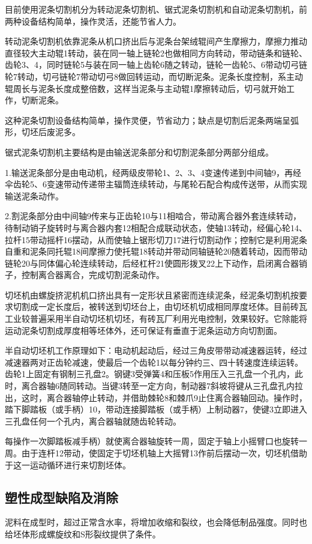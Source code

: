 \documentclass{ctexbook}
\begin{document}
目前使用泥条切割机分为转动泥条切割机、锯式泥条切割机和自动泥条切割机，前两种设备结构简单，操作灵活，还能节省人力。

转动泥条切割机依靠泥条从机口挤出后与泥条台架绒辊间产生摩擦力，摩擦力推动直径较大主动辊1转动，装在同一轴上链轮2也做相同方向转动，带动链条和链轮、齿轮3、4，同时链轮5与装在同一轴上齿轮6随之转动，链轮一齿轮5、6带动切弓链轮7转动，切弓链轮7带动切弓8做回转运动，而切断泥条。泥条长度控制，系主动辊周长与泥条长度成整倍数，这样当泥条与主动辊1摩擦转动后，切弓就开始工作，切断泥条。

这种泥条切割设备结构简单，操作灵便，节省动力；缺点是切割后泥条两端呈弧形，切坯后废泥多。

锯式泥条切割机主要结构是由输送泥条部分和切割泥条部分两部分组成。

1.输送泥条部分是由电动机，经两级皮带轮1、2、3、4变速传递到中间轴9，再经伞齿轮5、6变速带动传递带主辐筒连续转动，与尾轮石配合构成传送带，从而实现输送泥条动作。

2.割泥条部分由中间轴9传来与正齿轮10与11相啮合，带动离合器外套连续转动，待制动销子旋转时与离合器内套12相配合成联动状态，使轴13转动，经偏心轮14、拉杆15带动摇杆16摆动，从而使轴上锯形切刀17进行切割动作；控制它是利用泥条自重和泥条同托辊18间摩擦力使托辊18转动并带动同轴链轮20随着转动，因而带动链轮20与同体偏心轮连续转动，后经杠杆21使圆形拨叉22上下动作，启闭离合器销子，控制离合器离合，完成切割泥条动作。

切坯机由螺旋挤泥机机口挤出具有一定形状且紧密而连续泥条，经泥条切割机按要求切割成一定长度后，被转送到切坯台上，由切坯机切成相同厚度坯体。目前砖瓦工业较普遍采用半自动切坯机切坯，有砖瓦厂利用光电控制，效果较好。它除能将运动泥条切割成厚度相等坯体外，还可保证有垂直于泥条运动方向切割面。

半自动切坯机工作原理如下：电动机起动后，经过三角皮带带动减速器运转，经过减速器两对正齿轮减速，使最后一个齿轮1以每分钟约三、四十转速度连续运转。齿轮1上固定有钢制三孔盘2。钢键3受弹簧4和压板5作用压入三孔盘一个孔内，此时，离合器轴6随同转动。当键3转至一定方向，制动器7斜坡将键从三孔盘孔内拉出，这时，离合器轴停止转动，并借助棘轮8和棘爪9止住离合器轴回动。操作时，踏下脚踏板（或手柄）10，带动连接脚踏板（或手柄）上制动器7，使键3立即进入三孔盘任何一个孔内，离合器轴就随齿轮转动。

每操作一次脚踏板减手柄）就使离合器轴旋转一周，固定于轴上小摇臂口也旋转一周。由于连杆12带动，使固定于切坯机轴上大摇臂13作前后摆动一次，切坯机借助于这一运动循环进行来切割坯体。
\subsection{塑性成型缺陷及消除}
泥料在成型时，超过正常含水率，将增加收缩和裂纹，也会降低制品强度。同时也给坯体形成螺旋纹和S形裂纹提供了条件。
\end{document}
